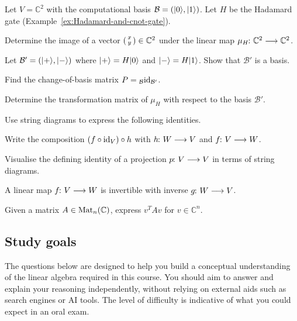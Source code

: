 \documentclass[a4paper, oneside, 12pt]{amsart}
\begin{document}
\begin{exercise}
  Let \(V = \mathbb{C}^2\) with the computational basis \(\mathcal{B} = (\lvert0\rangle, \lvert1\rangle)\).
  Let \(H\) be the Hadamard gate (Example~\ref{ex:Hadamard-and-cnot-gate}).
  \begin{thmlist}
    \item Determine the image of a vector \( \begin{psmallmatrix}x \\ y\end{psmallmatrix}
\in \mathbb{C}^{2}\) under the linear map \(\mu_{H}\from \mathbb{C}^{2}\to \mathbb{C}^{2}\).
    \item Let \(\mathcal{B}' = (\lvert+\rangle, \lvert-\rangle)\) where \(\lvert+\rangle = H\lvert0\rangle\) and \(\lvert-\rangle = H\lvert1\rangle\).
    Show that \(\mathcal{B}'\) is a basis.
    \item Find the change-of-basis matrix \(P = {}_{\mathcal{B}}\mathrm{id}_{\mathcal{B}'}\).
    \item Determine the transformation matrix of \(\mu_{H}\) with respect to the basis \(\mathcal{B}'\).
  \end{thmlist}
\end{exercise}

\begin{exercise}
  Use string diagrams to express the following identities.
  \begin{thmlist}
    \item Write the composition \((f\circ \mathrm{id}_{V})\circ h\) with \(h \from W \to V\) and \(f \from V\to W\).
    \item Visualise the defining identity of a projection \(p \from V \to V\) in terms of string diagrams.
    \item A linear map \(f \from V \to W\) is invertible with inverse \(g \from W \to V\).
    \item Given a matrix \(A\in \operatorname{Mat}_{n}( \mathbb{C})\), express \(v^{T}Av\) for \(v\in \mathbb{C}^{n}\).
  \end{thmlist}
\end{exercise}

\cleardoublepage
\subsection{Study goals}\label{sec:lin-alg-study-goals}
The questions below are designed to help you build a conceptual understanding of the linear algebra required in this course.
You should aim to answer and explain your reasoning independently, without relying on external aids such as search engines or AI tools.
The level of difficulty is indicative of what you could expect in an oral exam.
\end{document}
